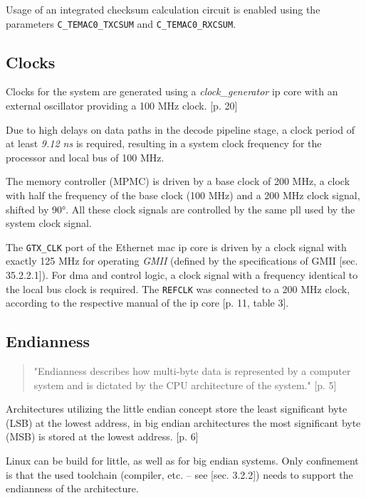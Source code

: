 Usage of an integrated checksum calculation circuit is enabled using the parameters \texttt{C\_TEMAC0\_TXCSUM} and \texttt{C\_TEMAC0\_RXCSUM}.

\subsection{Clocks}
\label{sec:clocks}

Clocks for the system are generated using a \textit{clock\_generator} \gls{ip} core with an external oscillator providing a 100 MHz clock. \cite{ug347}[p. 20]

Due to high delays on data paths in the decode pipeline stage, a clock period of at least \textit{9.12 ns} is required, resulting in a system clock frequency for the processor and local bus of 100 MHz.

The memory controller (MPMC) is driven by a base clock of 200 MHz, a clock with half the frequency of the base clock (100 MHz) and a 200 MHz clock signal, shifted by 90°. All these clock signals are controlled by the same \gls{pll} used by the system clock signal.

The \texttt{GTX\_CLK} port of the Ethernet \gls{mac} \gls{ip} core is driven by a clock signal with exactly 125 MHz for operating \textit{GMII} (defined by the specifications of GMII \cite{ieee802_3}[sec. 35.2.2.1]). For \gls{dma} and control logic, a clock signal with a frequency identical to the local bus clock is required. The \texttt{REFCLK} was connected to a 200 MHz clock, according to the respective manual of the \gls{ip} core \cite{xps_ll_temac}[p. 11, table 3].

\subsection{Endianness}

\begin{quote}
 "Endianness describes how multi-byte data is represented by a computer system and is dictated by the CPU architecture of the system." \cite{intel_endiannness}[p. 5]
\end{quote}

Architectures utilizing the little endian concept store the least significant byte (LSB) at the lowest address, in big endian architectures the most significant byte (MSB) is stored at the lowest address. \cite{intel_endiannness}[p. 6]

Linux can be build for little, as well as for big endian systems. Only confinement is that the used toolchain (compiler, etc. -- see \cite{projectseminar}[sec. 3.2.2]) needs to support the endianness of the architecture.

